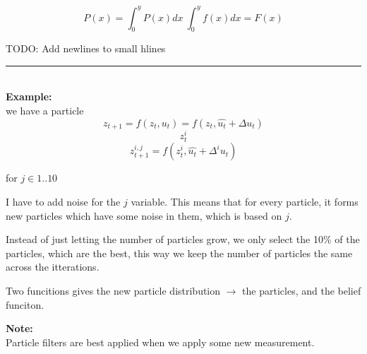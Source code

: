 \documentclass[a4paper]{article}
\begin{document}
\begin{equation}
	P(x) = \int_{0}^{y}P(x) dx ~ \int_{0}^{y}f(x) dx = F(x)
\end{equation}

TODO: Add newlines to small hlines

\vspace{5pt}
\rule{1cm}{0.4pt}
\vspace{5pt} \\
\textbf{Example:} \\
we have a particle
\[
	z_{t+1} = f(z_t, u_t) = f(z_t, \hat{u_t} + \Delta u_t)
\] 
\[
	z_t^{i} 
\] 
\[
	z_{t+1}^{i,j} = f(z_t^{i}, \hat{u_t} + \Delta^{i}u_t )
\] 

for $ j \in 1 .. 10 $

I have to add noise for the $ j $ variable. This means that for every particle, it forms new particles which have some noise in them, which is based on $ j $.

Instead of just letting the number of particles grow, we only select the 10\% of the particles, which are the best, this way we keep the number of particles the same across the itterations.


Two funcitions gives the new particle distribution $ \rightarrow  $ the particles, and the belief funciton.

\vspace{5pt}


\textbf{Note:} \\
Particle filters are best applied when we apply some new measurement. 
\end{document}

